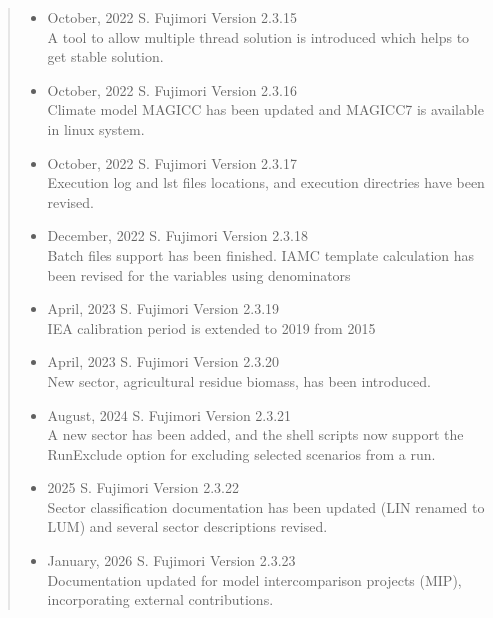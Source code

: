\documentclass[10pt,a4paper,titlepage,dvipdfmx]{book}
\begin{document}
\begin{quote}
\begin{itemize}
  \item October, 2022 S. Fujimori Version 2.3.15 \\
      A tool to allow multiple thread solution is introduced which helps to get stable solution.

  \item October, 2022 S. Fujimori Version 2.3.16 \\
      Climate model MAGICC has been updated and MAGICC7 is available in linux system.

  \item October, 2022 S. Fujimori Version 2.3.17 \\
      Execution log and lst files locations, and execution directries have been revised.
      
  \item December, 2022 S. Fujimori Version 2.3.18 \\
      Batch files support has been finished.
      IAMC template calculation has been revised for the variables using denominators 

  \item April, 2023 S. Fujimori Version 2.3.19 \\
      IEA calibration period is extended to 2019 from 2015 
      
  \item April, 2023 S. Fujimori Version 2.3.20 \\
      New sector, agricultural residue biomass, has been introduced.

  \item August, 2024 S. Fujimori Version 2.3.21 \\
      A new sector has been added, and the shell scripts now support the
      RunExclude option for excluding selected scenarios from a run.

  \item 2025 S. Fujimori Version 2.3.22 \\
      Sector classification documentation has been updated (LIN renamed to
      LUM) and several sector descriptions revised.

  \item January, 2026 S. Fujimori Version 2.3.23 \\
      Documentation updated for model intercomparison projects (MIP),
      incorporating external contributions. 
      
  \end{itemize}
\end{quote}
\newpage
\end{document}
